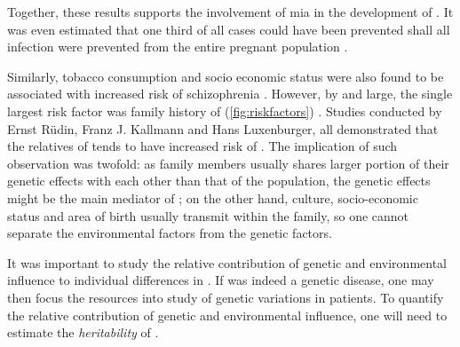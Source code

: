 	Together, these results supports the involvement of \gls{mia} in the development of .
	It was even estimated that one third of all  cases could have been prevented shall all infection were prevented from the entire pregnant population \citep{Brown2010}.
	
	Similarly, tobacco consumption \citep{Kelly1999} and socio economic status were also found to be associated with increased risk of schizophrenia \citep{McGrath2008a}.
	However, by and large, the single largest risk factor was family history of  (\cref{fig:riskfactors}) \citep{Sullivan2005}.
	Studies conducted by Ernst R{\"u}din, Franz J. Kallmann and Hans Luxenburger, all demonstrated that the relatives of  tends to have increased risk of  \citep{Gottesman1982}. 
	The implication of such observation was twofold:
	as family members usually shares larger portion of their genetic effects with each other than that of the population, the genetic effects might be the main mediator of ; 
	on the other hand, culture, socio-economic status and area of birth usually transmit within the family, so one cannot separate the environmental factors from the genetic factors.

	It was important to study the relative contribution of genetic and environmental influence to individual differences in .
	If  was indeed a genetic disease, one may then focus the resources into study of genetic variations in  patients. 
	To quantify the relative contribution of genetic and environmental influence, one will need to estimate the \emph{heritability} of .
	